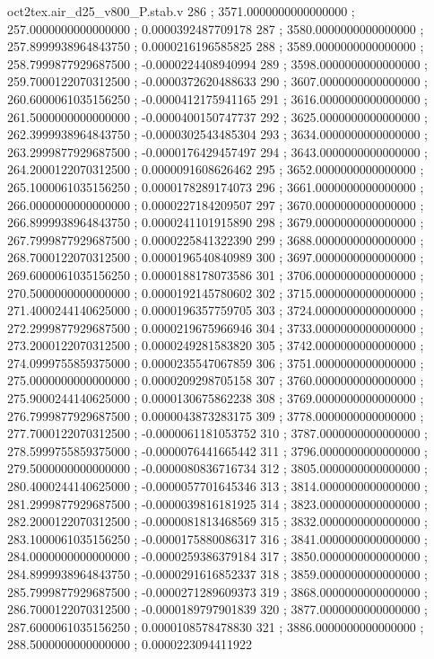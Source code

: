 \begin{filecontents}[overwrite]{oct2tex.air_d25_v800_P.stab.v}
286 ; 3571.0000000000000000 ; 257.0000000000000000 ; 0.0000392487709178
287 ; 3580.0000000000000000 ; 257.8999938964843750 ; 0.0000216196585825
288 ; 3589.0000000000000000 ; 258.7999877929687500 ; -0.0000224408940994
289 ; 3598.0000000000000000 ; 259.7000122070312500 ; -0.0000372620488633
290 ; 3607.0000000000000000 ; 260.6000061035156250 ; -0.0000412175941165
291 ; 3616.0000000000000000 ; 261.5000000000000000 ; -0.0000400150747737
292 ; 3625.0000000000000000 ; 262.3999938964843750 ; -0.0000302543485304
293 ; 3634.0000000000000000 ; 263.2999877929687500 ; -0.0000176429457497
294 ; 3643.0000000000000000 ; 264.2000122070312500 ; 0.0000091608626462
295 ; 3652.0000000000000000 ; 265.1000061035156250 ; 0.0000178289174073
296 ; 3661.0000000000000000 ; 266.0000000000000000 ; 0.0000227184209507
297 ; 3670.0000000000000000 ; 266.8999938964843750 ; 0.0000241101915890
298 ; 3679.0000000000000000 ; 267.7999877929687500 ; 0.0000225841322390
299 ; 3688.0000000000000000 ; 268.7000122070312500 ; 0.0000196540840989
300 ; 3697.0000000000000000 ; 269.6000061035156250 ; 0.0000188178073586
301 ; 3706.0000000000000000 ; 270.5000000000000000 ; 0.0000192145780602
302 ; 3715.0000000000000000 ; 271.4000244140625000 ; 0.0000196357759705
303 ; 3724.0000000000000000 ; 272.2999877929687500 ; 0.0000219675966946
304 ; 3733.0000000000000000 ; 273.2000122070312500 ; 0.0000249281583820
305 ; 3742.0000000000000000 ; 274.0999755859375000 ; 0.0000235547067859
306 ; 3751.0000000000000000 ; 275.0000000000000000 ; 0.0000209298705158
307 ; 3760.0000000000000000 ; 275.9000244140625000 ; 0.0000130675862238
308 ; 3769.0000000000000000 ; 276.7999877929687500 ; 0.0000043873283175
309 ; 3778.0000000000000000 ; 277.7000122070312500 ; -0.0000061181053752
310 ; 3787.0000000000000000 ; 278.5999755859375000 ; -0.0000076441665442
311 ; 3796.0000000000000000 ; 279.5000000000000000 ; -0.0000080836716734
312 ; 3805.0000000000000000 ; 280.4000244140625000 ; -0.0000057701645346
313 ; 3814.0000000000000000 ; 281.2999877929687500 ; -0.0000039816181925
314 ; 3823.0000000000000000 ; 282.2000122070312500 ; -0.0000081813468569
315 ; 3832.0000000000000000 ; 283.1000061035156250 ; -0.0000175880086317
316 ; 3841.0000000000000000 ; 284.0000000000000000 ; -0.0000259386379184
317 ; 3850.0000000000000000 ; 284.8999938964843750 ; -0.0000291616852337
318 ; 3859.0000000000000000 ; 285.7999877929687500 ; -0.0000271289609373
319 ; 3868.0000000000000000 ; 286.7000122070312500 ; -0.0000189797901839
320 ; 3877.0000000000000000 ; 287.6000061035156250 ; 0.0000108578478830
321 ; 3886.0000000000000000 ; 288.5000000000000000 ; 0.0000223094411922

\end{filecontents}

